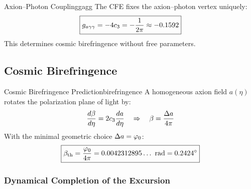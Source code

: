 \begin{corollary}{Axion--Photon Coupling}{gagg}
The CFE fixes the axion--photon vertex uniquely:
\begin{equation}
    \boxed{g_{a\gamma\gamma} = -4c_3 = -\frac{1}{2\pi} \approx -0.1592}
\end{equation}
This determines cosmic birefringence without free parameters.
\end{corollary}

\subsection{Cosmic Birefringence}

\begin{theorem}{Cosmic Birefringence Prediction}{birefringence}
A homogeneous axion field $a(\eta)$ rotates the polarization plane of light by:
\begin{equation}
    \frac{d\beta}{d\eta} = 2c_3\frac{da}{d\eta} 
    \quad\Rightarrow\quad 
    \beta = \frac{\Delta a}{4\pi}
\end{equation}
With the minimal geometric choice $\Delta a = \varphi_0$:
\begin{equation}
    \boxed{\beta_{\text{th}} = \frac{\varphi_0}{4\pi} = 0.0042312895\ldots~\text{rad} = 0.2424^\circ}
\end{equation}
\end{theorem}

\subsubsection{Dynamical Completion of the Excursion}
\label{sec:deltaa}

